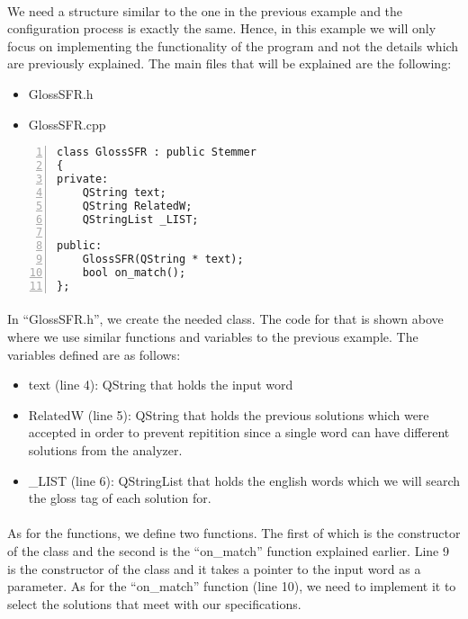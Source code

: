 \documentclass{article}
\begin{document}
\paragraph{}
We need a structure similar to the one in the previous example and the configuration process is exactly the same. Hence, in this example we will only focus on implementing the functionality of the program and not the details which are previously explained. The main files that will be explained are the following:

\begin{itemize}
\item GlossSFR.h
\item GlossSFR.cpp
\end{itemize}

\begin{Verbatim}[numbers=left]
class GlossSFR : public Stemmer
{
private:
    QString text;
    QString RelatedW;
    QStringList _LIST;

public:
    GlossSFR(QString * text);
    bool on_match();
};
\end{Verbatim}

\paragraph{}
In ``GlossSFR.h'', we create the needed class. The code for that is shown above where we use similar functions and variables to the previous example. The variables defined are as follows:

\begin{itemize}
\item text (line 4): QString that holds the input word
\item RelatedW (line 5): QString that holds the previous solutions which were accepted in order to prevent repitition since a single word can have different solutions from the analyzer.
\item \_LIST (line 6): QStringList that holds the english words which we will search the gloss tag of each solution for.
\end{itemize}

\paragraph{}
As for the functions, we define two functions. The first of which is the constructor of the class and the second is the ``on\_match'' function explained earlier. Line 9 is the constructor of the class and it takes a pointer to the input word as a parameter. As for the ``on\_match'' function (line 10), we need to implement it to select the solutions that meet with our specifications.
\end{document}
